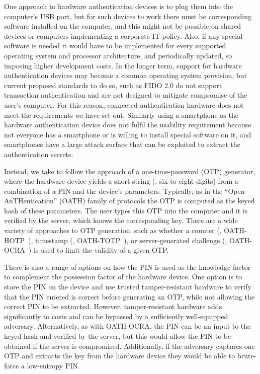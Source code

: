 One approach to hardware authentication devices is to plug them into the computer's USB port, but for such devices to work there must be corresponding software installed on the computer, and this might not be possible on shared devices or computers implementing a corporate IT policy.
Also, if any special software is needed it would have to be implemented for every supported operating system and processor architecture, and periodically updated, so imposing higher development costs.
In the longer term, support for hardware authentication devices may become a common operating system provision, but current proposed standards to do so, such as FIDO 2.0 do not support transaction authentication and are not designed to mitigate compromise of the user's computer.
For this reason, connected authentication hardware does not meet the requirements we have set out.
Similarly using a smartphone as the hardware authentication device does not fulfil the usability requirement because not everyone has a smartphone or is willing to install special software on it, and smartphones have a large attack surface that can be exploited to extract the authentication secrets.

Instead, we take to follow the approach of a one-time-password (OTP) generator, where the hardware device yields a short string (\eg, six to eight digits) from a combination of a PIN and the device's parameters. Typically, as in the ``Open AuTHentication'' (OATH) family of protocols the OTP is computed as the keyed hash of these parameters. The user types this OTP into the computer and it is verified by the server, which knows the corresponding key. There are a wide variety of approaches to OTP generation, such as whether a counter (\eg, OATH-HOTP~\cite{oath-hotp}), timestamp (\eg, OATH-TOTP~\cite{oath-totp}), or server-generated challenge (\eg, OATH-OCRA~\cite{oath-ocra}) is used to limit the validity of a given OTP.  %

There is also a range of options on how the PIN is used as the knowledge factor to complement the possession factor of the hardware device.
One option is to store the PIN on the device and use trusted tamper-resistant hardware to verify that the PIN entered is correct before generating an OTP, while not allowing the correct PIN to be extracted.
However, tamper-resistant hardware adds significantly to costs and can be bypassed by a sufficiently well-equipped adversary.
Alternatively, as with OATH-OCRA, the PIN can be an input to the keyed hash and verified by the server, but this would allow the PIN to be obtained if the server is compromised.
Additionally, if the adversary captures one OTP and extracts the key from the hardware device they would be able to brute-force a low-entropy PIN.


